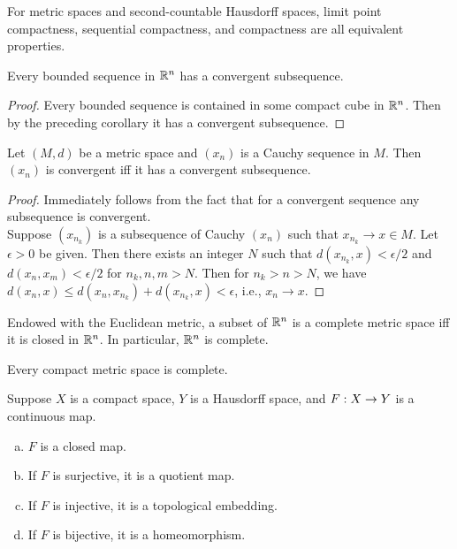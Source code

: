 \documentclass[11pt,a4paper]{article}
\begin{document}
\begin{corollary}
For metric spaces and second-countable Hausdorff spaces, limit point compactness, sequential compactness, and compactness are all equivalent properties.
\end{corollary}

\begin{prop}
Every bounded sequence in $\mathbb{R}^n$ has a convergent subsequence.
\end{prop}

\begin{proof}
Every bounded sequence is contained in some compact cube in $\mathbb{R}^n$. Then by the preceding corollary it has a convergent subsequence.
\end{proof}

\begin{prop}
Let $(M,d)$ be a metric space and $(x_n)$ is a Cauchy sequence in $M$. Then $(x_n)$ is convergent iff it has a convergent subsequence.
\end{prop}

\begin{proof}
\forward Immediately follows from the fact that for a convergent sequence any subsequence is convergent.
\\
\converse Suppose $(x_{n_k})$ is a subsequence of Cauchy $(x_n)$ such that $x_{n_k}\rightarrow x\in M$. Let $\epsilon>0$ be given. Then there exists an integer $N$ such that $d(x_{n_k},x)<\epsilon/2$ and $d(x_n,x_m)<\epsilon/2$ for $n_k,n,m>N$. Then for $n_k>n>N$, we have $d(x_{n},x)\le d(x_n,x_{n_k})+d(x_{n_k},x)<\epsilon$, i.e., $x_n\rightarrow x$.
\end{proof}

\begin{prop}
Endowed with the Euclidean metric, a subset of $\mathbb{R}^n$ is a complete metric space iff it is closed in $\mathbb{R}^n$. In particular, $\mathbb{R}^n$ is complete.
\end{prop}

\begin{prop}
Every compact metric space is complete.
\end{prop}

\begin{prop}
Suppose $X$ is a compact space, $Y$ is a Hausdorff space, and $F:X\rightarrow Y$ is a continuous map.
\begin{enumerate}[(a)]
    \item $F$ is a closed map.
    \item If $F$ is surjective, it is a quotient map.
    \item If $F$ is injective, it is a topological embedding.
    \item If $F$ is bijective, it is a homeomorphism.
\end{enumerate}
\end{prop}
\end{document}
